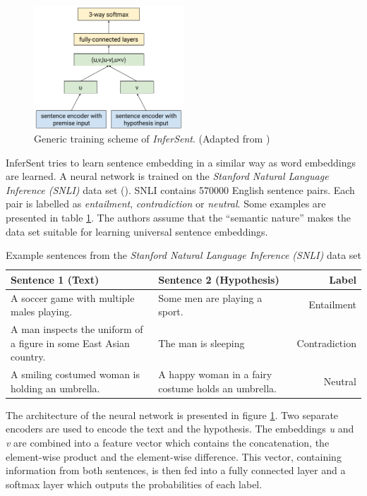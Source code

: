 \begin{figure}[ht]
\centering
	\includegraphics[width=0.5\textwidth,scale=0.5]{images/nli}
	\caption{Generic training scheme of \emph{InferSent}. (Adapted from \cite{Conneau:2017aa})}
		\label{fig:infersent}
\end{figure}
InferSent tries to learn sentence embedding in a similar way as word embeddings are learned. A neural network is trained on the \emph{Stanford Natural Language Inference (SNLI)} data set (\cite{snli:emnlp2015}). SNLI contains 570000 English sentence pairs. Each pair is labelled as \emph{entailment}, \emph{contradiction} or \emph{neutral}. Some examples are presented in table \ref{tbl:snli}. The authors assume that the \enquote{semantic nature} %
makes the data set suitable for learning universal sentence embeddings.

\begin{table}[ht]
\caption{Example sentences from the \emph{Stanford Natural Language Inference (SNLI)} data set}
\label{tbl:snli}
\begin{tabularx}{\linewidth}{XXr}
\toprule
Sentence 1 (Text) & Sentence 2 (Hypothesis) & Label \\ \midrule
A soccer game with multiple males playing. & Some men are playing a sport. & Entailment \\
A man inspects the uniform of a figure in some East Asian country. & The man is sleeping & Contradiction \\
A smiling costumed woman is holding an umbrella. & A happy woman in a fairy costume holds an umbrella. & Neutral \\
\bottomrule
\end{tabularx}
\end{table}

The architecture of the neural network is presented in figure \ref{fig:infersent}. Two separate encoders are used to encode the text and the hypothesis. The embeddings \emph{u} and \emph{v} are combined into a feature vector which contains the concatenation, the element-wise product and the element-wise difference. This vector, containing information from both sentences, is then fed into a fully connected layer and a softmax layer which outputs the probabilities of each label.

